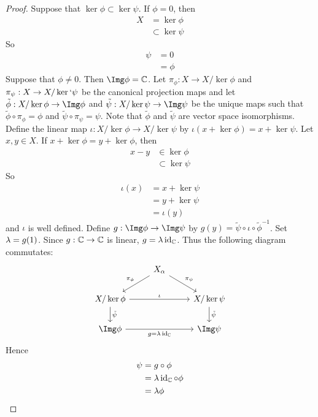 \documentclass{book}
\begin{document}
	\begin{proof}
		Suppose that $\ker  \phi \subset \ker \psi$. If $\phi = 0$, then 
		\begin{align*}
			X 
			& = \ker \phi\\
			& \subset \ker \psi 
		\end{align*}
		So 
		\begin{align*}
			\psi 
			& = 0 \\
			& = \phi
		\end{align*}
		Suppose that $\phi \neq 0$. Then $\Img \phi = \C$. Let $\pi_{\phi}: X \rightarrow X / \ker \phi$ and $\pi_{\psi}: X \rightarrow X / \ker` \psi$ be the canonical projection maps and let $\tilde{\phi}: X / \ker \phi \rightarrow \Img \phi$ and $\tilde{\psi}:X / \ker \psi \rightarrow \Img \psi$ be the unique maps such that $\tilde{\phi} \circ \pi_{\phi} = \phi$ and $\tilde{\psi} \circ \pi_{\psi} = \psi$. Note that $\tilde{\phi}$ and $\tilde{\psi}$ are vector space isomorphisms. Define the linear map $\iota: X /\ker \phi \rightarrow X / \ker \psi$ by $\iota(x + \ker \phi) = x + \ker \psi$. Let $x,y \in X$. If $x + \ker \phi = y + \ker \phi$, then 
		\begin{align*}
			x -y 
			& \in \ker \phi \\
			& \subset \ker \psi 
		\end{align*}
		So 
		\begin{align*}
			\iota(x) 
			& = x + \ker \psi \\
			& = y + \ker \psi \\
			& = \iota(y)
		\end{align*}
		and $\iota$ is well defined. Define $g: \Img \phi \rightarrow \Img \psi$ by $g(y) = \tilde{\psi} \circ \iota \circ \tilde{\phi}^{-1}$. Set $\lambda = g(1)$. Since $g: \mathbb{C} \rightarrow \mathbb{C}$ is linear, $g = \lambda \operatorname{id}_{\mathbb{C}}$. Thus the following diagram commutates: 
		\[ 
		\begin{tikzcd}
			& X_{\al} \arrow[dr, "\pi_{\psi}"] \arrow[dl, "\pi_{\phi}"'] &  \\
			X / \ker \phi \arrow[rr, "\iota"] \arrow[d, "\tilde{\psi}"] & & X / \ker \psi  \arrow[d, "\tilde{\psi}"] \\
			\Img \phi \arrow[rr, "g = \lam \id_{\C}"'] & & \Img \psi
		\end{tikzcd}
		\]
		Hence 
		\begin{align*}
			\psi
			& = g \circ \phi \\
			& = \lambda \operatorname{id}_{\mathbb{C}} \circ \phi \\
			& = \lambda \phi
		\end{align*} 
	\end{proof}
\end{document}
